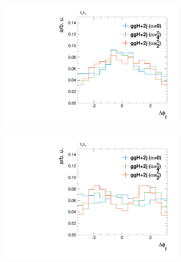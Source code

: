\begin{figure}[h!]
    \centering
    \begin{subfigure}{.45\textwidth}
        \centering
        \includegraphics[width=\textwidth]{Figures/eventselection/CPHypotheses/tt/JHU_jdphi_no_cuts.pdf} %
    \end{subfigure}
    \begin{subfigure}{.45\textwidth}
        \centering
        \includegraphics[width=\textwidth]{Figures/eventselection/CPHypotheses/tt/JHU_jdphi_mjj_cuts.pdf}%

\end{subfigure}
\end{figure}

